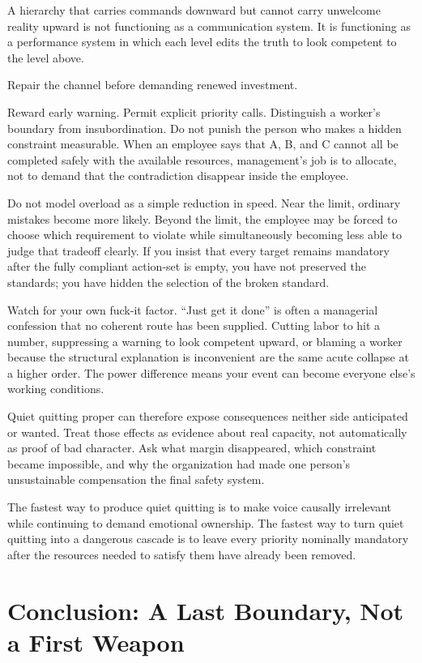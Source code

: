 \documentclass[11pt,oneside]{article}
\begin{document}
A hierarchy that carries commands downward but cannot carry unwelcome
reality upward is not functioning as a communication system. It is
functioning as a performance system in which each level edits the truth
to look competent to the level above.

Repair the channel before demanding renewed investment.

Reward early warning. Permit explicit priority calls. Distinguish a
worker's boundary from insubordination. Do not punish the person who
makes a hidden constraint measurable. When an employee says that A, B,
and C cannot all be completed safely with the available resources,
management's job is to allocate, not to demand that the contradiction
disappear inside the employee.

Do not model overload as a simple reduction in speed. Near the limit,
ordinary mistakes become more likely. Beyond the limit, the employee may
be forced to choose which requirement to violate while simultaneously
becoming less able to judge that tradeoff clearly. If you insist that
every target remains mandatory after the fully compliant action-set is
empty, you have not preserved the standards; you have hidden the
selection of the broken standard.

Watch for your own fuck-it factor. ``Just get it done'' is often a
managerial confession that no coherent route has been supplied. Cutting
labor to hit a number, suppressing a warning to look competent upward,
or blaming a worker because the structural explanation is inconvenient
are the same acute collapse at a higher order. The power difference
means your event can become everyone else's working conditions.

Quiet quitting proper can therefore expose consequences neither side
anticipated or wanted. Treat those effects as evidence about real
capacity, not automatically as proof of bad character. Ask what margin
disappeared, which constraint became impossible, and why the
organization had made one person's unsustainable compensation the final
safety system.

The fastest way to produce quiet quitting is to make voice causally
irrelevant while continuing to demand emotional ownership. The fastest
way to turn quiet quitting into a dangerous cascade is to leave every
priority nominally mandatory after the resources needed to satisfy them
have already been removed.

\section{Conclusion: A Last Boundary, Not a First
Weapon}\label{conclusion-a-last-boundary-not-a-first-weapon}
\end{document}
